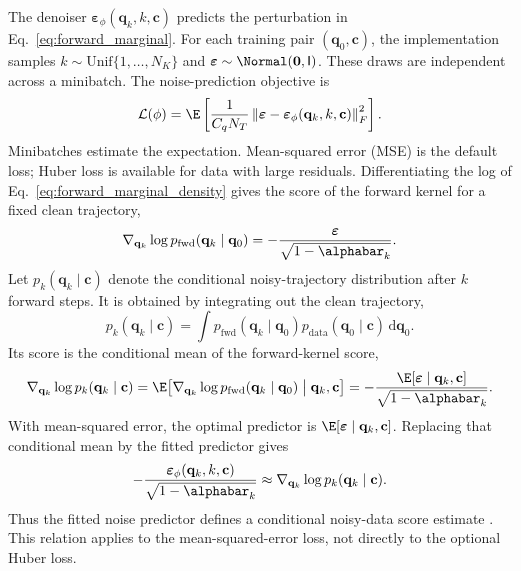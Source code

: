 The denoiser $\boldsymbol{\varepsilon}_\phi(\mathbf{q}_k,k,\mathbf{c})$
predicts the perturbation in Eq.~\eqref{eq:forward_marginal}. For each training
pair $(\mathbf{q}_0,\mathbf{c})$, the implementation samples
$k\sim\mathrm{Unif}\{1,\ldots,N_K\}$ and
$\boldsymbol{\varepsilon}\sim\Normal(\mathbf{0},\mathsf{I})$. These draws are
independent across a minibatch. The noise-prediction objective is
\begin{equation}
    \mathcal{L}(\phi)
    =
    \E
    \left[
        \frac{1}{C_qN_T}
        \left\|
            \boldsymbol{\varepsilon}
            -
            \boldsymbol{\varepsilon}_\phi
            (\mathbf{q}_k,k,\mathbf{c})
        \right\|_F^2
    \right].
    \label{eq:noise_objective}
\end{equation}
Minibatches estimate the expectation. Mean-squared error (MSE) is the default
loss; Huber loss is available for data with large residuals.
Differentiating the log of
Eq.~\eqref{eq:forward_marginal_density} gives the score of the forward kernel for
a fixed clean trajectory,
\begin{equation}
    \nabla_{\mathbf{q}_k}
    \log p_{\mathrm{fwd}}(\mathbf{q}_k\mid\mathbf{q}_0)
    =
    -\frac{\boldsymbol{\varepsilon}}
            {\sqrt{1-\alphabar_k}}.
    \label{eq:conditional_score}
\end{equation}
Let $p_k(\mathbf{q}_k\mid\mathbf{c})$ denote the conditional noisy-trajectory distribution
after $k$ forward steps. It is obtained by integrating out the clean trajectory,
\begin{equation}
    p_k(\mathbf{q}_k\mid\mathbf{c})
    =
    \int p_{\mathrm{fwd}}(\mathbf{q}_k\mid\mathbf{q}_0)
    p_{\mathrm{data}}(\mathbf{q}_0\mid\mathbf{c})
    \,\mathrm{d}\mathbf{q}_0.
    \label{eq:conditional_noisy_density}
\end{equation}
Its score is the conditional mean of the forward-kernel score,
\begin{equation}
    \nabla_{\mathbf{q}_k}\log p_k(\mathbf{q}_k\mid\mathbf{c})
    =
    \E\!\left[
        \nabla_{\mathbf{q}_k}
        \log p_{\mathrm{fwd}}(\mathbf{q}_k\mid\mathbf{q}_0)
        \mathrel{\big|}\mathbf{q}_k,\mathbf{c}
    \right]
    =
    -\frac{\E[\boldsymbol{\varepsilon}\mid\mathbf{q}_k,\mathbf{c}]}
            {\sqrt{1-\alphabar_k}}.
    \label{eq:conditional_score_identity}
\end{equation}
With mean-squared error, the optimal predictor is
$\E[\boldsymbol{\varepsilon}\mid\mathbf{q}_k,\mathbf{c}]$. Replacing that
conditional mean by the fitted predictor gives
\begin{equation}
    -\frac{\boldsymbol{\varepsilon}_\phi(\mathbf{q}_k,k,\mathbf{c})}
           {\sqrt{1-\alphabar_k}}
    \approx
    \nabla_{\mathbf{q}_k}\log p_k(\mathbf{q}_k\mid\mathbf{c}).
    \label{eq:data_score}
\end{equation}
Thus the fitted noise predictor defines a conditional noisy-data score estimate
\cite{vincent2011connection,hyvarinen2005score}. This relation applies to the
mean-squared-error loss, not directly to the optional Huber loss.

